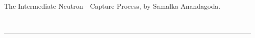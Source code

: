 \documentclass{article}
\newcounter{counter}
\newcounter{table_counter}
\begin{document}
The Intermediate Neutron - Capture Process, \newline
by Samalka Anandagoda.














\ \hrule
\end{document}
